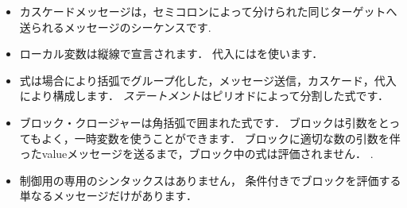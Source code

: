 \documentclass[a4paper,10pt,twoside]{book}
\begin{document}
\begin{itemize}
\item		カスケードメッセージは，セミコロンによって分けられた同じターゲットへ送られるメッセージのシーケンスです.

\item		ローカル変数は縦線で宣言されます．
		代入には\ct{:=}を使います．

\item		式は場合により括弧でグループ化した，メッセージ送信，カスケード，代入により構成します．
		\emph{ステートメント}はピリオドによって分割した式です．

\item		ブロック・クロージャーは角括弧で囲まれた式です．
		ブロックは引数をとってもよく，一時変数を使うことができます．
		ブロックに適切な数の引数を伴ったvalueメッセージを送るまで，ブロック中の式は評価されません．
		.

\item		制御用の専用のシンタックスはありません，
		条件付きでブロックを評価する単なるメッセージだけがあります．

\end{itemize}

\ifx\wholebook\relax\else
\end{document}
